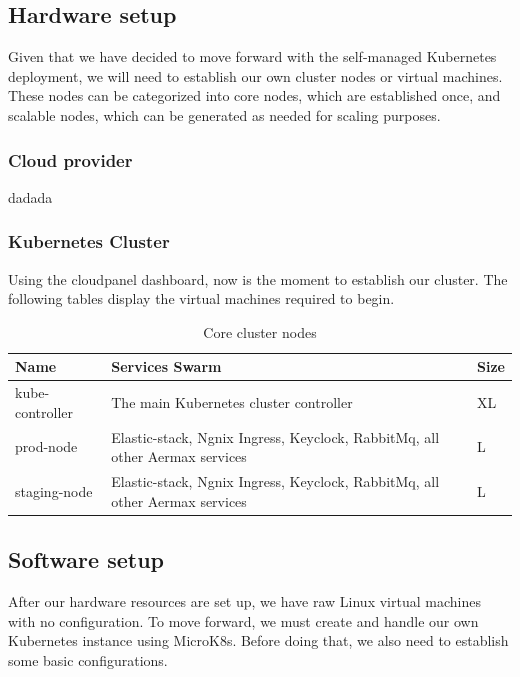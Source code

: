 \subsection{Hardware setup}
Given that we have decided to move forward with the self-managed Kubernetes deployment, we will need to establish our own cluster nodes or virtual machines. These nodes can be categorized into core nodes, which are established once, and scalable nodes, which can be generated as needed for scaling purposes.
\subsubsection{Cloud provider}
dadada
\subsubsection{Kubernetes Cluster}
Using the cloudpanel dashboard, now is the moment to establish our cluster. The following tables display the virtual machines required to begin.

\begin{table}[h!]
  \centering
  \renewcommand{\arraystretch}{1.5} 
  \caption{ Core cluster nodes}
  \label{tab: core_cluster_nodes}
  \begin{tabularx}{\textwidth}{|>{\centering\arraybackslash}X|>{\centering\arraybackslash}X|>{\centering\arraybackslash}X|}
      \hline
      \rowcolor{blue!20} 
      \textbf{Name} & \textbf{Services Swarm} & \textbf{Size} \\
      \hline
      kube-controller & The main Kubernetes cluster controller  & XL \\
      \hline
      prod-node & Elastic-stack, Ngnix Ingress, Keyclock, RabbitMq, all other Aermax services  & L \\
      \hline
      staging-node & Elastic-stack, Ngnix Ingress, Keyclock, RabbitMq, all other Aermax services  & L \\
      \hline
  \end{tabularx}
\end{table}


\subsection{Software setup}
After our hardware resources are set up, we have raw Linux virtual machines with no configuration. To move forward, we must create and handle our own Kubernetes instance using MicroK8s. Before doing that, we also need to establish some basic configurations.

